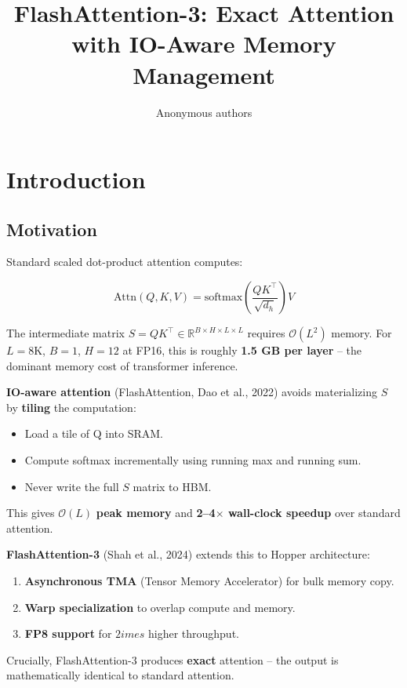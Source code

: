 \title{\textbf{FlashAttention-3: Exact Attention with IO-Aware Memory Management}}

\author{Anonymous authors}


\section{Introduction}

\subsection{Motivation}

Standard scaled dot-product attention computes:

\[
\text{Attn}(Q, K, V) = \text{softmax}\!\left(\frac{Q K^\top}{\sqrt{d_h}}\right) V
\tag{1.1}
\]

The intermediate matrix $S = QK^\top \in \mathbb{R}^{B \times H \times L \times L}$ 
requires $\mathcal{O}(L^2)$ memory. For $L = 8\text{K}$, $B = 1$, $H = 12$ 
at FP16, this is roughly \textbf{1.5 GB per layer} -- the dominant memory cost 
of transformer inference.

\textbf{IO-aware attention} (FlashAttention, Dao et al., 2022) avoids 
materializing $S$ by \textbf{tiling} the computation:

\begin{itemize}
\item Load a tile of Q into SRAM.
\item Compute softmax incrementally using running max and running sum.
\item Never write the full $S$ matrix to HBM.

\end{itemize}
This gives $\mathcal{O}(L)$ \textbf{peak memory} and \textbf{2--4$\times$ wall-clock speedup} 
over standard attention.

\textbf{FlashAttention-3} (Shah et al., 2024) extends this to Hopper 
architecture:

\begin{enumerate}
\item \textbf{Asynchronous TMA} (Tensor Memory Accelerator) for bulk memory copy.
\item \textbf{Warp specialization} to overlap compute and memory.
\item \textbf{FP8 support} for $2	imes$ higher throughput.

\end{enumerate}
Crucially, FlashAttention-3 produces \textbf{exact} attention -- the output is 
mathematically identical to standard attention.

